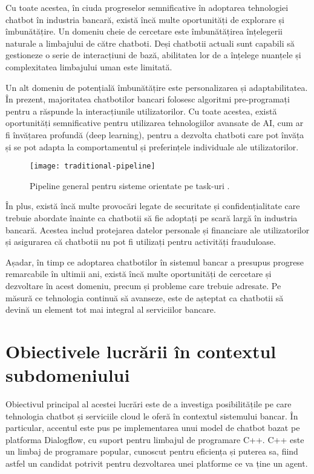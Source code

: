 Cu toate acestea, în ciuda progreselor semnificative în adoptarea tehnologiei chatbot în industria bancară, există încă multe oportunități de explorare și îmbunătățire. Un domeniu cheie de cercetare este îmbunătățirea înțelegerii naturale a limbajului de către chatboti. Deși chatbotii actuali sunt capabili să gestioneze o serie de interacțiuni de bază, abilitatea lor de a înțelege nuanțele și complexitatea limbajului uman este limitată.

Un alt domeniu de potențială îmbunătățire este personalizarea și adaptabilitatea. În prezent, majoritatea chatbotilor bancari folosesc algoritmi pre-programați pentru a răspunde la interacțiunile utilizatorilor. Cu toate acestea, există oportunități semnificative pentru utilizarea tehnologiilor avansate de AI, cum ar fi învățarea profundă (deep learning), pentru a dezvolta chatboti care pot învăța și se pot adapta la comportamentul și preferințele individuale ale utilizatorilor.

\begin{figure}[h] %
    \centering
    \texttt{[image: traditional-pipeline]}
    \caption{Pipeline general pentru sisteme orientate pe task-uri \cite{chen_liu_yin_tang_dialogue_2017}.}
    \label{fig:traditional-pipeline}
\end{figure}

În plus, există încă multe provocări legate de securitate și confidențialitate care trebuie abordate înainte ca chatbotii să fie adoptați pe scară largă în industria bancară. Acestea includ protejarea datelor personale și financiare ale utilizatorilor și asigurarea că chatbotii nu pot fi utilizați pentru activități frauduloase.

Așadar, în timp ce adoptarea chatbotilor în sistemul bancar a presupus progrese remarcabile în ultimii ani, există încă multe oportunități de cercetare și dezvoltare în acest domeniu, precum și probleme care trebuie adresate. Pe măsură ce tehnologia continuă să avanseze, este de așteptat ca chatbotii să devină un element tot mai integral al serviciilor bancare.

\section{Obiectivele lucrării în contextul subdomeniului}

Obiectivul principal al acestei lucrări este de a investiga posibilitățile pe care tehnologia chatbot și serviciile cloud le oferă în contextul sistemului bancar. În particular, accentul este pus pe implementarea unui model de chatbot bazat pe platforma Dialogflow, cu suport pentru limbajul de programare C++. C++ este un limbaj de programare popular, cunoscut pentru eficiența și puterea sa, fiind astfel un candidat potrivit pentru dezvoltarea unei platforme ce va ține un agent.

